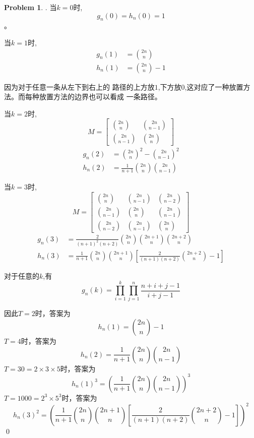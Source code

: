 \documentclass[UTF8]{ctexart}
\newenvironment{sol}
  {\par\vspace{3mm}\noindent{\it Solution}.}
  {\qed \\ \medskip}
\theoremstyle{definition}
\newtheorem{problem}{Problem}
\begin{document}
\begin{problem}
\begin{sol}
    当$k=0$时, 
    $$g_n(0) = h_n(0) = 1$$。

    当$k=1$时, 
    \begin{align*}
        g_n(1) &= \binom{2n}{n} \\
        h_n(1) &= \binom{2n}{n} - 1
    \end{align*}
    
    因为对于任意一条从左下到右上的
    路径的上方放$1$,下方放$0$,这对应了一种放置方法。而每种放置方法的边界也可以看成
    一条路径。

    当$k=2$时, 
    $$
    M = 
    \begin{bmatrix}
        \binom{2n}{n} & \binom{2n}{n-1} \\
        \binom{2n}{n-1} & \binom{2n}{n} 
    \end{bmatrix}
    $$
    \begin{align*}
    g_n(2) &= \binom{2n}{n}^2 - \binom{2n}{n-1}^2 \\
    h_n(2) &= \frac {1} {n+1}\binom{2n}{n}\binom{2n}{n-1}
    \end{align*}

    当$k=3$时, 
    $$
    M = 
    \begin{bmatrix}
        \binom{2n}{n} & \binom{2n}{n-1} & \binom{2n}{n-2} \\
        \binom{2n}{n-1} & \binom{2n}{n} & \binom{2n}{n-1} \\
        \binom{2n}{n-2} & \binom{2n}{n-1} & \binom{2n}{n} 
    \end{bmatrix}
    $$
    \begin{align*}
        g_n(3) &= \frac 2 {(n+1)^2(n+2)}\binom{2n}{n}\binom{2n+1}{n}\binom{2n+2}{n} \\
        h_n(3) &= \frac 1 {n+1}\binom{2n}{n}\binom{2n+1}{n} \left[ \frac {2} {(n+1)(n+2)}\binom{2n+2}{n}-1 \right]
    \end{align*}

    对于任意的$k$,有
    $$g_n(k)=\prod_{i=1}^k\prod_{j=1}^n\frac {n+i+j-1} {i+j-1}$$

    因此$T=2$时，答案为
    $$
        h_n(1) = \binom{2n}{n} - 1
    $$
    $T=4$时，答案为
    $$
        h_n(2) = \frac {1} {n+1}\binom{2n}{n}\binom{2n}{n-1}
    $$
    $T=30=2\times 3\times 5$时，答案为
    $$
        h_n(1)^3 = \left( \frac {1} {n+1}\binom{2n}{n}\binom{2n}{n-1} \right)^3
    $$
    $T=1000=2^3 \times 5^3$时，答案为
    $$
        h_n(3)^2 = \left( \frac 1 {n+1}\binom{2n}{n}\binom{2n+1}{n} \left[ \frac {2} {(n+1)(n+2)}\binom{2n+2}{n}-1 \right] \right)^2
    $$
\end{sol}
\end{problem}
\end{document}
